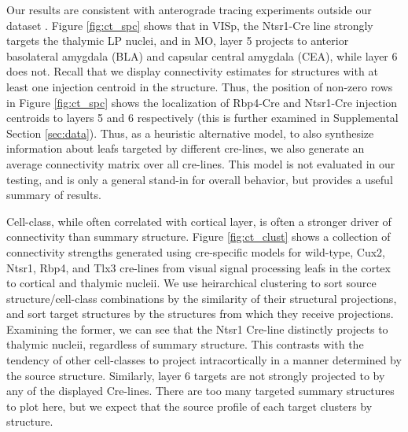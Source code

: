 Our results are consistent with anterograde tracing experiments outside our dataset \citet{Jeong2016-dc}.
Figure \ref{fig:ct_spc} shows that in VISp, the Ntsr1-Cre line strongly targets the thalymic LP nuclei, and in MO, layer 5 projects to anterior basolateral amygdala (BLA) and capsular central amygdala (CEA), while layer 6 does not.
Recall that we display connectivity estimates for structures with at least one injection centroid in the structure.
Thus, the position of non-zero rows in Figure \ref{fig:ct_spc} shows the localization of Rbp4-Cre and Ntsr1-Cre injection centroids to layers 5 and 6 respectively (this is further examined in Supplemental Section \ref{sec:data}).
Thus, as a heuristic alternative model, to also synthesize information about leafs targeted by different cre-lines, we also generate an average connectivity matrix over all cre-lines.
This model is not evaluated in our testing, and is only a general stand-in for overall behavior, but provides a useful summary of results.

Cell-class, while often correlated with cortical layer, is often a stronger driver of connectivity than summary structure.
Figure \ref{fig:ct_clust} shows a collection of connectivity strengths generated using cre-specific models for wild-type, Cux2, Ntsr1, Rbp4, and Tlx3 cre-lines from visual signal processing leafs in the cortex to cortical and thalymic nucleii.
We use heirarchical clustering to sort source structure/cell-class combinations by the similarity of their structural projections, and sort target structures by the structures from which they receive projections.
Examining the former, we can see that the Ntsr1 Cre-line distinctly projects to thalymic nucleii, regardless of summary structure.
This contrasts with the tendency of other cell-classes to project intracortically in a manner determined by the source structure.
Similarly, layer 6 targets are not strongly projected to by any of the displayed Cre-lines.
There are too many targeted summary structures to plot here, but we expect that the source profile of each target clusters by structure.

\newpage

